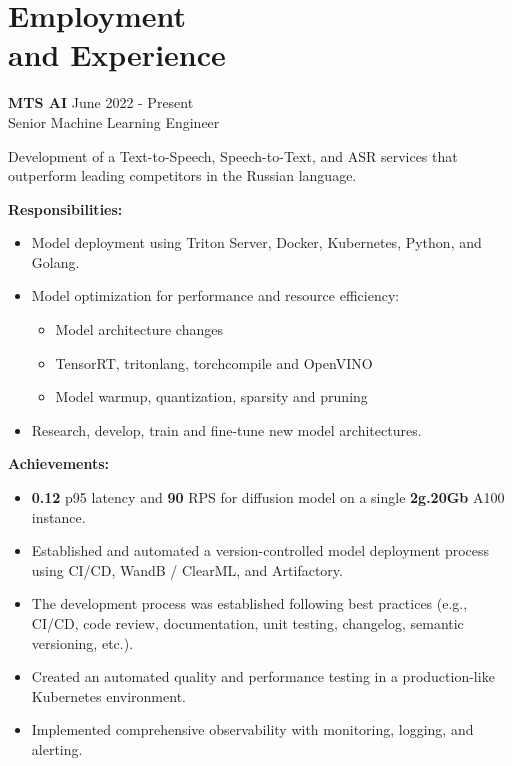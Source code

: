 \section{\sc Employment \\and Experience}
\vspace{2.6pt}

\textbf{MTS AI} \hfill June 2022 - Present \\
Senior Machine Learning Engineer

Development of a Text-to-Speech, Speech-to-Text, and ASR services that outperform leading competitors in the Russian language.

\textbf{Responsibilities:}

\begin{itemize}[left=0pt, label={--}]
    \item Model deployment using Triton Server, Docker, Kubernetes, Python, and Golang.
    \item Model optimization for performance and resource efficiency:
    \begin{itemize}[topsep=0pt]
        \item Model architecture changes
        \item TensorRT, tritonlang, torchcompile and OpenVINO
        \item Model warmup, quantization, sparsity and pruning
    \end{itemize}
    \item Research, develop, train and fine-tune new model architectures.
\end{itemize}

\textbf{Achievements:}

\begin{itemize}[left=0pt, label={--}]
    \item \textbf{0.12} p95 latency and \textbf{90} RPS for diffusion model on a single \textbf{2g.20Gb} A100 instance.
    \item Established and automated a version-controlled model deployment process using CI/CD, WandB / ClearML, and Artifactory.
    \item The development process was established following best practices (e.g., CI/CD, code review, documentation, unit testing, changelog, semantic versioning, etc.).
    \item Created an automated quality and performance testing in a production-like Kubernetes environment.
    \item Implemented comprehensive observability with monitoring, logging, and alerting.
\end{itemize}

